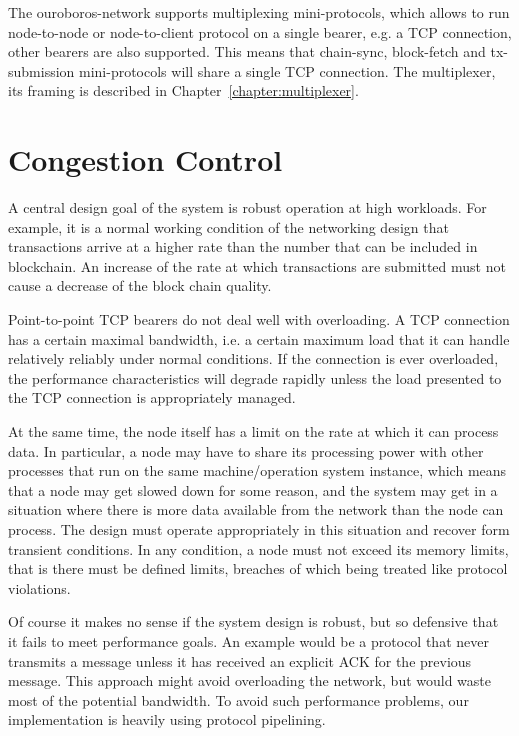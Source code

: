 The ouroboros-network supports multiplexing mini-protocols, which allows to run
node-to-node or node-to-client protocol on a single bearer, e.g. a TCP
connection, other bearers are also supported.  This means that chain-sync,
block-fetch and tx-submission mini-protocols will share a single TCP
connection.  The multiplexer, its framing is described in
Chapter~\ref{chapter:multiplexer}.

\section{Congestion Control}
A central design goal of the system is robust operation at high workloads.  For
example, it is a normal working condition of the networking design that
transactions arrive at a higher rate than the number that can be included in
blockchain.  An increase of the rate at which transactions are submitted must
not cause a decrease of the block chain quality.

Point-to-point TCP bearers do not deal well with overloading.  A TCP connection
has a certain maximal bandwidth, i.e. a certain maximum load that it can handle
relatively reliably under normal conditions.  If the connection is ever
overloaded, the performance characteristics will degrade rapidly unless the
load presented to the TCP connection is appropriately managed.

At the same time, the node itself has a limit on the rate at which it can
process data.  In particular, a node may have to share its processing power
with other processes that run on the same machine/operation system instance,
which means that a node may get slowed down for some reason, and the system may
get in a situation where there is more data available from the network than the
node can process.  The design must operate appropriately in this situation and
recover form transient conditions.  In any condition, a node must not exceed
its memory limits, that is there must be defined limits, breaches of which
being treated like protocol violations.

Of course it makes no sense if the system design is robust, but so defensive
that it fails to meet performance goals.  An example would be a protocol that
never transmits a message unless it has received an explicit ACK for the
previous message. This approach might avoid overloading the network, but would
waste most of the potential bandwidth.  To avoid such performance problems, our
implementation is heavily using protocol pipelining.


